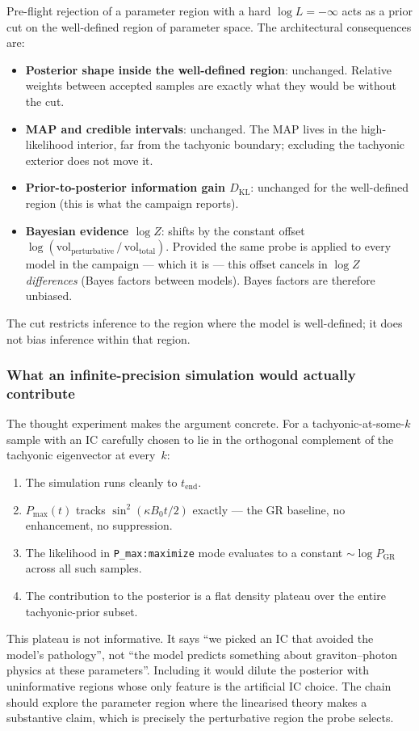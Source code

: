 Pre-flight rejection of a parameter region with a hard
$\log L = -\infty$ acts as a prior cut on the well-defined region of
parameter space. The architectural consequences are:
\begin{itemize}
  \item \textbf{Posterior shape inside the well-defined region}:
    unchanged. Relative weights between accepted samples are exactly
    what they would be without the cut.
  \item \textbf{MAP and credible intervals}: unchanged. The MAP lives
    in the high-likelihood interior, far from the tachyonic boundary;
    excluding the tachyonic exterior does not move it.
  \item \textbf{Prior-to-posterior information gain $D_\mathrm{KL}$}:
    unchanged for the well-defined region (this is what the campaign
    reports).
  \item \textbf{Bayesian evidence $\log Z$}: shifts by the constant
    offset
    $\log(\mathrm{vol}_\mathrm{perturbative}\,/\,\mathrm{vol}_\mathrm{total})$.
    Provided the same probe is applied to every model in the campaign
    --- which it is --- this offset cancels in $\log Z$ \emph{differences}
    (Bayes factors between models). Bayes factors are therefore
    unbiased.
\end{itemize}
The cut restricts inference to the region where the model is
well-defined; it does not bias inference within that region.

\subsubsection{What an infinite-precision simulation would actually
contribute}

The thought experiment makes the argument concrete. For a
tachyonic-at-some-$k$ sample with an IC carefully chosen to lie in
the orthogonal complement of the tachyonic eigenvector at every~$k$:
\begin{enumerate}
  \item The simulation runs cleanly to $t_{\text{end}}$.
  \item $P_{\max}(t)$ tracks $\sin^2(\kappa B_0 t / 2)$ exactly --- the
    GR baseline, no enhancement, no suppression.
  \item The likelihood in
    \texttt{P\_max:maximize} mode evaluates to a constant
    ${\sim}\log P_\mathrm{GR}$ across all such samples.
  \item The contribution to the posterior is a flat density plateau
    over the entire tachyonic-prior subset.
\end{enumerate}
This plateau is not informative. It says ``we picked an IC that
avoided the model's pathology'', not ``the model predicts something
about graviton--photon physics at these parameters''. Including it
would dilute the posterior with uninformative regions whose only
feature is the artificial IC choice. The chain should explore the
parameter region where the linearised theory makes a substantive
claim, which is precisely the perturbative region the probe selects.

